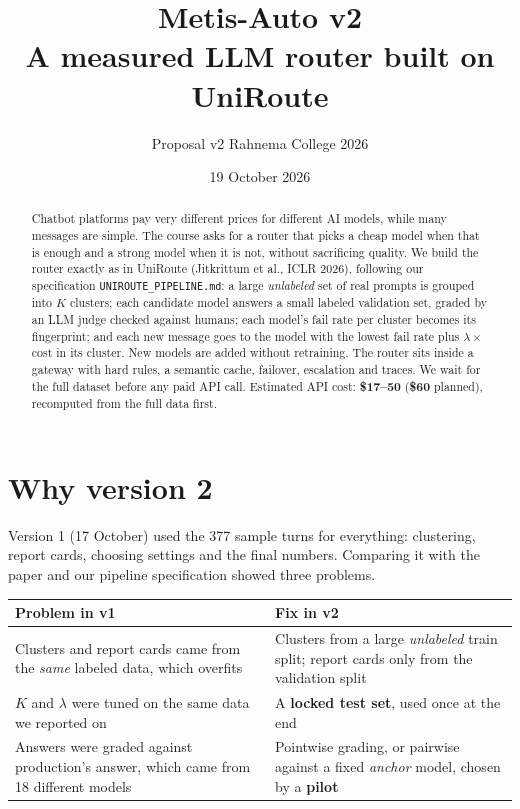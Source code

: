 \documentclass[11pt,a4paper]{article}
\title{\textbf{Metis-Auto v2}\\[2pt]\large A measured LLM router built on UniRoute}
\author{Proposal v2 \quad\textbullet\quad Rahnema College 2026}
\date{19 October 2026}
\begin{document}
\maketitle

\begin{abstract}
\noindent Chatbot platforms pay very different prices for different AI models, while many messages
are simple. The course asks for a router that picks a cheap model when that is enough and a strong
model when it is not, without sacrificing quality. We build the router exactly as in UniRoute
(Jitkrittum et al., ICLR 2026), following our specification \texttt{UNIROUTE\_PIPELINE.md}: a large
\emph{unlabeled} set of real prompts is grouped into $K$ clusters; each candidate model answers a small
labeled validation set, graded by an LLM judge checked against humans; each model's fail rate per
cluster becomes its fingerprint; and each new message goes to the model with the lowest fail rate plus
$\lambda\times$cost in its cluster. New models are added without retraining. The router sits inside a
gateway with hard rules, a semantic cache, failover, escalation and traces. We wait for the full
dataset before any paid API call. Estimated API cost: \textbf{\$17--50} (\textbf{\$60} planned),
recomputed from the full data first.
\end{abstract}

\section{Why version 2}

Version 1 (17 October) used the 377 sample turns for everything: clustering, report cards, choosing
settings and the final numbers. Comparing it with the paper and our pipeline specification showed
three problems.

\medskip
\noindent\begin{tabularx}{\linewidth}{@{}P{70mm} L@{}}
\toprule
\textbf{Problem in v1} & \textbf{Fix in v2} \\
\midrule
Clusters and report cards came from the \emph{same} labeled data, which overfits & Clusters from a large \emph{unlabeled} train split; report cards only from the validation split \\
$K$ and $\lambda$ were tuned on the same data we reported on & A \textbf{locked test set}, used once at the end \\
Answers were graded against production's answer, which came from 18 different models & Pointwise grading, or pairwise against a fixed \emph{anchor} model, chosen by a \textbf{pilot} \\
\bottomrule
\end{tabularx}
\end{document}
